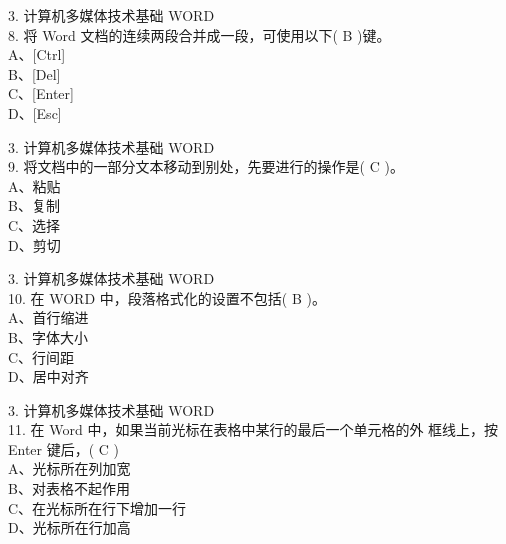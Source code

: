 \documentclass[aspectratio=169]{beamer}
\begin{document}
\begin{frame}[t]{3. 计算机多媒体技术基础} \vspace{20pt}
    WORD\\
8. 将 Word 文档的连续两段合并成一段，可使用以下( B )键。\\
A、[Ctrl]\\ B、[Del]\\ C、[Enter]\\ D、[Esc]\\
\end{frame}

\begin{frame}[t]{3. 计算机多媒体技术基础} \vspace{20pt}
    WORD\\
9. 将文档中的一部分文本移动到别处，先要进行的操作是( C )。\\
A、粘贴\\ B、复制\\ C、选择\\ D、剪切\\
\end{frame}


\begin{frame}[t]{3. 计算机多媒体技术基础} \vspace{20pt}
    WORD\\
10. 在 WORD 中，段落格式化的设置不包括( B )。\\
A、首行缩进\\ B、字体大小\\ C、行间距\\ D、居中对齐\\
\end{frame}



\begin{frame}[t]{3. 计算机多媒体技术基础} \vspace{20pt}
    WORD\\
11. 在 Word 中，如果当前光标在表格中某行的最后一个单元格的外
框线上，按 Enter 键后，( C )\\
A、光标所在列加宽\\
B、对表格不起作用\\
C、在光标所在行下增加一行\\
D、光标所在行加高\\
\end{frame}
\end{document}
